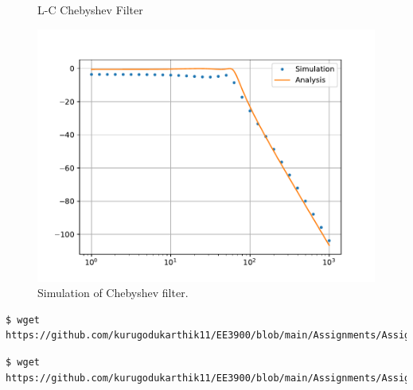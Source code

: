 \documentclass[journal,12pt,twocolumn]{IEEEtran}
\renewcommand\thesection{\arabic{section}}
\begin{document}
\begin{enumerate}[label=\thesection.\arabic*
,ref=\thesection.\theenumi]
\begin{figure}[!ht]
    \caption{L-C Chebyshev Filter}
    \label{fig:cheby-filter}
\end{figure}
\begin{figure}
    \includegraphics[width=\columnwidth]{figs/5.4.pdf}
    \caption{Simulation of Chebyshev filter.}
    \label{fig:sim-cheby}
\end{figure}
\begin{lstlisting}
$ wget https://github.com/kurugodukarthik11/EE3900/blob/main/Assignments/Assignment_6/codes/5.4.py
\end{lstlisting}
\begin{lstlisting}
$ wget https://github.com/kurugodukarthik11/EE3900/blob/main/Assignments/Assignment_6/codes/5.4.cir
\end{lstlisting}
\end{enumerate}
\end{document}
